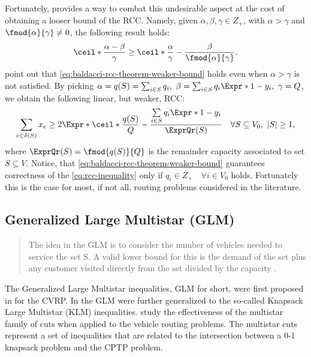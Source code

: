 Fortunately, \textcite{baldacci2007capacitated} provides a way to
combat this undesirable aspect at the cost of obtaining a looser bound of the RCC.
Namely, given $\alpha, \beta, \gamma \in Z_+$, with $\alpha > \gamma$ and
$\fmod{\alpha}{\gamma} \ne 0$, the following result holds:
\begin{equation}
	\label{eq:baldacci-rcc-theorem-weaker-bound}
	\ceil*{\frac{\alpha - \beta}{\gamma}} \ge \ceil*{\frac{\alpha}{\gamma}} - \frac{\beta}{\fmod{\alpha}{\gamma}}.
\end{equation}
\textcite{jepsen2014} point out that \cref{eq:baldacci-rcc-theorem-weaker-bound}
holds even when $\alpha > \gamma$ is not satisfied.
By picking $\alpha = q(S) = \sum_{i \in S} q_i,\ \beta = \sum_{i \in S} q_i\Expr*{1 - y_i},\ \gamma = Q$,
we obtain the following linear, but weaker, RCC:
\begin{equation}
	\label{eq:rcc-inequality}
	\sum\limits_{e \in \delta(S)} x_e \ge 2 \Expr*{\ceil*{\frac{q(S)}{Q}} - \frac{\sum\limits_{i \in S} q_i \Expr*{1 - y_i}}{\ExprQr(S)}} \quad \forall S \subseteq V_0,\ |S| \ge 1,
\end{equation}
where $\ExprQr(S) = \fmod{q(S)}{Q}$ is the remainder capacity associated to set $S \subseteq V$.
Notice, that \cref{eq:baldacci-rcc-theorem-weaker-bound} guarantees correctness
of the \cref{eq:rcc-inequality} only if $q_i \in Z_+ \quad \forall i \in V_0$ holds.
Fortunately this is the case for most, if not all, routing problems considered in the literature.

\subsection{Generalized Large Multistar (GLM)}
\label{sec:cptp-glm}

\begin{quote}
	The idea in the GLM is to consider the number of vehicles needed to service
	the set S. A valid lower bound for this is the demand of the set plus any
	customer visited directly from the set divided by the capacity \cite{jepsen2011}.
\end{quote}

The Generalized Large Multistar inequalities,
GLM for short,
were first proposed in \textcite{gouveia1995} for the CVRP.
In \textcite{letchford2002}
the GLM were further generalized to the so-called Knapsack Large Multistar (KLM) inequalities.
\textcite{letchford2006} study the effectiveness of the multistar family of cuts
when applied to the vehicle routing problems.
The multistar cuts represent a set of inequalities that are related to
the intersection between a 0-1 knapsack problem and the CPTP problem.

